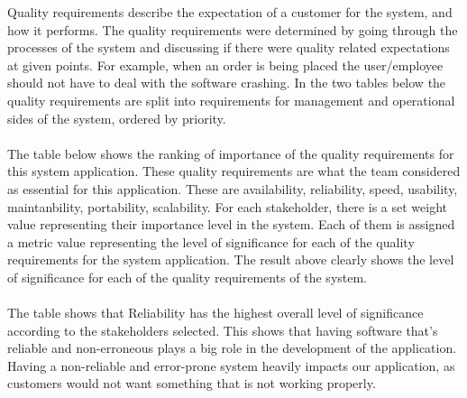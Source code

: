 Quality requirements describe the expectation of a customer for the system, and how it performs. The quality requirements were determined by going through the processes of the system and discussing if there were quality related expectations at given points. For example, when an order is being placed the user/employee should not have to deal with the software crashing. In the two tables below the quality requirements are split into requirements for management and operational sides of the system, ordered by priority. \\ \\The table below shows the ranking of importance of the quality requirements for this system application. These quality requirements are what the team considered as essential for this application. These are availability, reliability, speed, usability, maintanbility, portability, scalability.
For each stakeholder, there is a set weight value representing their importance level in the system. Each of them is assigned a metric value representing the level of significance for each of the quality requirements for the system application. The result above clearly shows the level of significance for each of the quality requirements of the system.\\ \\
The table shows that Reliability has the highest overall level of significance according to the stakeholders selected. This shows that having software that's reliable and non-erroneous plays a big role in the development of the application. Having a non-reliable and error-prone system heavily impacts our application, as customers would not want something that is not working properly.


